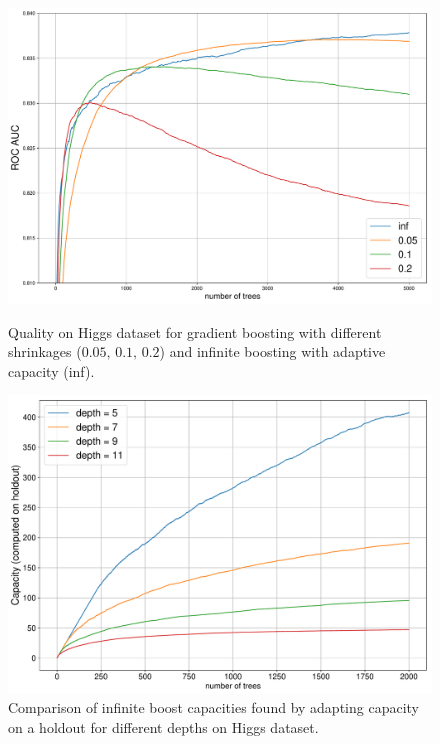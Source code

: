 \begin{figure}[!h]
  \centering
  \begin{multicols}{2}
    \includegraphics[width=1\linewidth]{../research/plots/rocauc_higgs.pdf}
    \caption{Quality on Higgs dataset for gradient boosting with different shrinkages ($0.05, \, 0.1,\, 0.2$) and infinite boosting with adaptive capacity (inf). \label{fig:gb-auc}}
    \includegraphics[width=1\linewidth]{../research/plots/various_depths_higgs.pdf}
    \caption{Comparison of infinite boost capacities found by adapting capacity on a holdout for different depths on Higgs dataset. \label{fig:gb-depth}}
  \end{multicols}
\end{figure}

